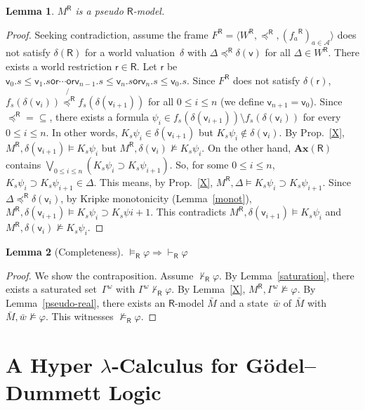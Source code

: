\documentclass[doctor]{iscs-thesis}
\newcommand{\agents}{\mathcal A}
\newcommand{\tuple}[1]{\langle{#1}\rangle}
\newcommand{\vdashR}{\vdash_{\mathsf R}}
\newcommand{\R}[1]{{#1}^{\mathsf R}}
\newcommand{\modelsR}{\models_{\mathsf R}}
\newtheorem{lemma}{Lemma}
\newcommand{\wor}{\mathsf{{or}}}
\begin{document}
\begin{lemma}
 $\R M$ is a pseudo $\mathsf R$-model.
\end{lemma}
\begin{proof}
 Seeking contradiction,
 assume the frame $\R F = \tuple{\R W, \R\preceq, (\R
 {f_a})_{a\in\agents}}$
 does not satisfy $\delta(\mathsf R)$ for
 a world valuation~$\delta$ with
 $\Delta\R\preceq\delta(\mathsf v)$ for all $\Delta\in\R W$.
 There exists a world restriction
 $\mathsf r\in\mathsf R$.
 Let $\mathsf r$ be $\mathsf v_0.s\le\mathsf v_1.s\wor\cdots \wor\mathsf
 v_{n-1}.s\le\mathsf v_n.s\wor\mathsf v_n.s\le\mathsf v_0.s$.
 Since $\R F$ does not satisfy $\delta(\mathsf r)$,
 $f_s(\delta(\mathsf v_i))\not{\R \preceq}f_s(\delta(\mathsf v_{i+1}))$
 for
 all $0\le i\le n$ (we define $\mathsf v_{n+1} = \mathsf v_0$).
 Since $\R\preceq = \subseteq$, there exists
 a formula $\psi_i\in f_s(\delta(\mathsf v_{i+1}))\setminus
 f_s(\delta(\mathsf v_i))$ for every $0\le i\le n$.
 In other words, $K_s\psi_i\in\delta(\mathsf v_{i+1})$
 but $K_s\psi_i\notin\delta(\mathsf v_i)$.
 By Prop.~\ref{X},
 $\R M,\delta(\mathsf v_{i+1})\models K_s\psi_i$ but
 $\R M,\delta(\mathsf v_{i})\not\models K_s\psi_i$.
 On the other hand, $\mathbf{Ax}(\mathsf R)$ contains
 $\bigvee_{0\le i\le n}\left(K_s\psi_i\supset K_s\psi_{i+1}\right)$.
 So, for some $0\le i\le n$,
 $K_s\psi_i\supset K_s\psi_{i+1}\in\Delta$.
 This means, by Prop.~\ref{X},
 $\R M,\Delta\models K_s\psi_i\supset K_s\psi_{i+1}$.
 Since $\Delta\R\preceq\delta(\mathsf v_i)$,
 by Kripke monotonicity (Lemma~\ref{monot}),
 $\R M,\delta(\mathsf v_{i+1})\models K_s\psi_i\supset K_s\psi{i+1}$.
 This contradicts $\R M,\delta(\mathsf v_{i+1})\models K_s\psi_i$ and
 $\R M,\delta(\mathsf v_i)\not\models K_s\psi_i$.
\end{proof}
 
\begin{lemma}[Completeness]
 $\modelsR\varphi\Longrightarrow\vdashR\varphi$
\end{lemma}
\begin{proof}
 We show the contraposition.
 Assume $\not\vdashR \varphi$. By
 Lemma~\ref{saturation}, there exists
 a saturated set~$\Gamma^\omega$ with $\Gamma^\omega\not\vdashR\varphi$.
 By Lemma~\ref{X}, $\R M, \Gamma^\omega\not\models\varphi$.
 By Lemma~\ref{pseudo-real}, there exists an
 $\mathsf R$-model $\bar M$ and a state~$\bar w$ of $\bar M$
 with $\bar M,\bar w\not\models \varphi$.
 This witnesses $\not\modelsR\varphi$.
\end{proof}

\chapter{A Hyper $\lambda$-Calculus for G\"odel--Dummett Logic}
\end{document}
